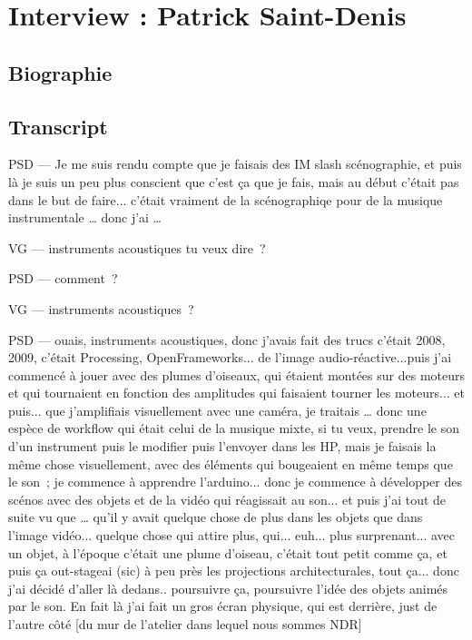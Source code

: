 \chapter{Interview : Patrick Saint-Denis}

\section*{Biographie}


\section*{Transcript}


PSD — Je me suis rendu compte que je faisais des IM slash scénographie, et puis là je suis un peu plus conscient que c'est ça que je fais, mais au début c'était pas dans le but de faire... c'était vraiment de la scénographiqe pour de la musique instrumentale … donc j'ai … 

VG —  instruments acoustiques tu veux dire ? 

PSD — comment ? 

VG —  instruments acoustiques ? 

PSD — ouais, instruments acoustiques, donc j'avais fait des trucs c'était 2008, 2009, c'était Processing, OpenFrameworks... de l'image audio-réactive...puis j'ai commencé à jouer avec des plumes d'oiseaux, qui étaient montées sur des moteurs et qui tournaient en fonction des amplitudes qui faisaient tourner les moteurs... et puis... que j'amplifiais visuellement avec une caméra, je traitais … donc une espèce de workflow qui était celui de la musique mixte, si tu veux, prendre le son d'un instrument puis le modifier puis l'envoyer dans les HP, mais je faisais la même chose visuellement, avec des éléments qui bougeaient en même temps que le son ; je commence à apprendre l'arduino... donc je commence à développer des scénos avec des objets et de la vidéo qui réagissait au son... et puis j'ai tout de suite vu que … qu'il y avait quelque chose de plus dans les objets que dans l'image vidéo... quelque chose qui attire plus, qui... euh... plus surprenant... avec un objet, à l'époque c'était une plume d'oiseau, c'était tout petit comme ça, et puis ça out-stageai (sic) à peu près les projections architecturales, tout ça... donc j'ai décidé d'aller là dedans.. poursuivre ça, poursuivre l'idée des objets animés par le son. En fait là j'ai fait un gros écran physique, qui est derrière, just de l'autre côté [du mur de l'atelier dans lequel nous sommes NDR]  

